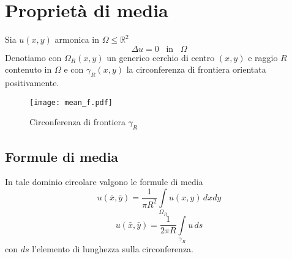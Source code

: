 \section{Propriet\`a di media}
Sia $u(x,y)$ armonica in $\Omega \leq \mathbb{R}^2$
\[
	\Delta u= 0 \;\;\; \text{in} \;\;\; \Omega
\]
Denotiamo con $\Omega_R(x,y)$ un generico cerchio di centro $(x,y)$ e raggio
$R$ contenuto in $\Omega$ e con $\gamma_R(x,y)$ la circonferenza di frontiera
orientata positivamente.
\begin{figure}[H]
	\centering
	\texttt{[image: mean\_f.pdf]}
	\caption{Circonferenza di frontiera $\gamma_R$}
	\label{mean_f}
\end{figure}
\noindent
\subsection{Formule di media}
In tale dominio circolare valgono le formule di media
\[
	u(\bar{x}, \bar{y})= \frac{1}{\pi R^2}
	\int \limits_{\Omega_R}
	u(x,y) \, dxdy
\]
\[
	u(\bar{x}, \bar{y})= \frac{1}{2 \pi R}
	\int \limits_{\gamma_R}
	u \, ds
\]
con $ds$ l'elemento di lunghezza sulla circonferenza.
